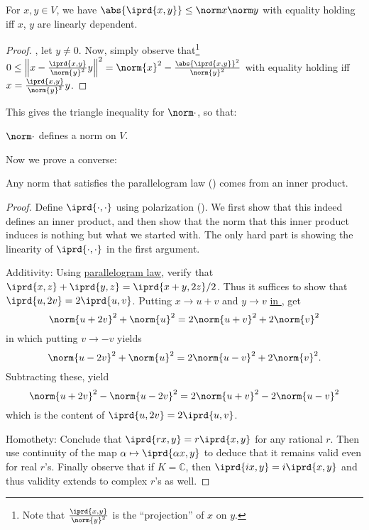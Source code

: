 	\begin{prp}\label{PRP: cauchy-schwarz}
		For $x, y\in V$, we have $\abs{\iprd{x, y}}\le \norm x\norm y$ with equality holding iff $x$, $y$ are linearly dependent.
	\end{prp}
	
	\begin{proof}
		\Wlogg, let $y\ne 0$. Now, simply observe that\footnote{Note that $\frac{\iprd{x, y}}{\norm{y}^2}$ is the ``projection'' of $x$ on $y$.} $0 \le \Bigl\Vert x - \frac{\iprd{x, y}}{\norm{y}^2} y\Bigr\Vert^2 = \norm{x}^2 - \frac{\abs{\iprd{x, y}}^2}{\norm{y}^2}$ with equality holding iff $x = \frac{\iprd{x, y}}{\norm{y}^2}y$.
	\end{proof}
	
	This gives the triangle inequality for $\norm\cdot$, so that:
	
	\begin{cor}\label{COR: norm due to inner prod}
		$\norm\cdot$ defines a norm on $V$.
	\end{cor}
	
	Now we prove a converse:
	
	\begin{prp}
		Any norm that satisfies the parallelogram law () comes from an inner product.
	\end{prp}
	
	\begin{proof}
		Define $\iprd{\cdot, \cdot}$ using polarization (). We first show that this indeed defines an inner product, and then show that the norm that this inner product induces is nothing but what we started with. The only hard part is showing the linearity of $\iprd{\cdot, \cdot}$ in the first argument.
		
		Additivity: Using \uline{parallelogram law}, verify that $\iprd{x, z} + \iprd{y, z} = \iprd{x + y, 2z}/2$. Thus it suffices to show that $\iprd{u, 2v} = 2\iprd{u, v}$. Putting $x\to u + v$ and $y\to v$ \uline{in \mbox{}}, get
		\[
		\norm{u + 2v}^2 + \norm{u}^2 = 2\norm{u + v}^2 + 2\norm{v}^2
		\]
		in which putting $v\to -v$ yields
		\[
		\norm{u - 2v}^2 + \norm{u}^2 = 2\norm{u - v}^2 + 2\norm{v}^2\text.
		\]
		Subtracting these, yield
		\[
		\norm{u + 2v}^2 - \norm{u - 2v}^2 = 2\norm{u + v}^2 - 2\norm{u - v}^2
		\]
		which is the content of $\iprd{u, 2v} = 2\iprd{u, v}$.
		
		Homothety: Conclude that $\iprd{rx, y} = r\iprd{x, y}$ for any rational $r$. Then use continuity of the map $\alpha\mapsto \iprd{\alpha x, y}$ to deduce that it remains valid even for real $r$'s. Finally observe that if $K = \mathbb C$, then $\iprd{ix, y} = i\iprd{x, y}$ and thus validity extends to complex $r$'s as well.
	\end{proof}
	
